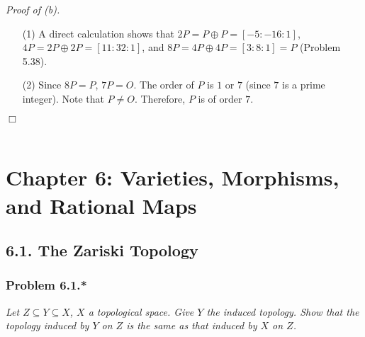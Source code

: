 \documentclass{article}
\begin{document}
\emph{Proof of (b).}
\begin{enumerate}
\item[(1)]
  A direct calculation shows that $2P = P \oplus P = [-5:-16:1]$,
  $4P = 2P \oplus 2P = [11:32:1]$, and
  $8P = 4P \oplus 4P = [3:8:1] = P$
  (Problem 5.38).

\item[(2)]
  Since $8P = P$, $7P = O$.
  The order of $P$ is $1$ or $7$ (since $7$ is a prime integer).
  Note that $P \neq O$.
  Therefore, $P$ is of order $7$.
\end{enumerate}
$\Box$ \\\\






\newpage
\section*{Chapter 6: Varieties, Morphisms, and Rational Maps \\}



\subsection*{6.1. The Zariski Topology \\}



\subsubsection*{Problem 6.1.*}
\emph{Let $Z \subseteq Y \subseteq X$, $X$ a topological space.
Give $Y$ the induced topology.
Show that the topology induced by $Y$ on $Z$ is the same as that induced by $X$ on $Z$.} \\
\end{document}
